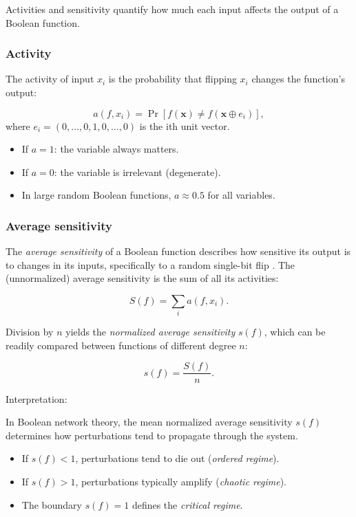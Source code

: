 \documentclass[
]{article}
\providecommand{\tightlist}{%
  \setlength{\itemsep}{0pt}\setlength{\parskip}{0pt}}
\begin{document}
Activities and sensitivity quantify how much each input affects the
output of a Boolean function.

\subsubsection{Activity}\label{activity}

The activity of input \(x_i\) is the probability that flipping \(x_i\)
changes the function's output:

\[
a(f,x_i) = \Pr[f(\mathbf{x}) \neq f(\mathbf{x} \oplus e_i)],
\] where \(e_i=(0,\ldots,0,1,0,\ldots,0)\) is the ith unit vector.

\begin{itemize}
\tightlist
\item
  If \(a = 1\): the variable always matters.
\item
  If \(a = 0\): the variable is irrelevant (degenerate).
\item
  In large random Boolean functions, \(a \approx 0.5\) for all
  variables.
\end{itemize}

\subsubsection{Average sensitivity}\label{average-sensitivity}

The \emph{average sensitivity} of a Boolean function describes how
sensitive its output is to changes in its inputs, specifically to a
random single-bit flip \citep{shmulevich2004activities}. The
(unnormalized) average sensitivity is the sum of all its activities:

\[
S(f) = \sum_i a(f,x_i).
\]

Division by \(n\) yields the \emph{normalized average sensitivity}
\(s(f)\), which can be readily compared between functions of different
degree \(n\):

\[
s(f) = \frac{S(f)}{n}.
\]

Interpretation:

In Boolean network theory, the mean normalized average sensitivity
\(s(f)\) determines how perturbations tend to propagate through the
system.

\begin{itemize}
\tightlist
\item
  If \(s(f) < 1\), perturbations tend to die out (\emph{ordered
  regime}).
\item
  If \(s(f) > 1\), perturbations typically amplify (\emph{chaotic
  regime}).
\item
  The boundary \(s(f) = 1\) defines the \emph{critical regime}.
\end{itemize}
\end{document}
